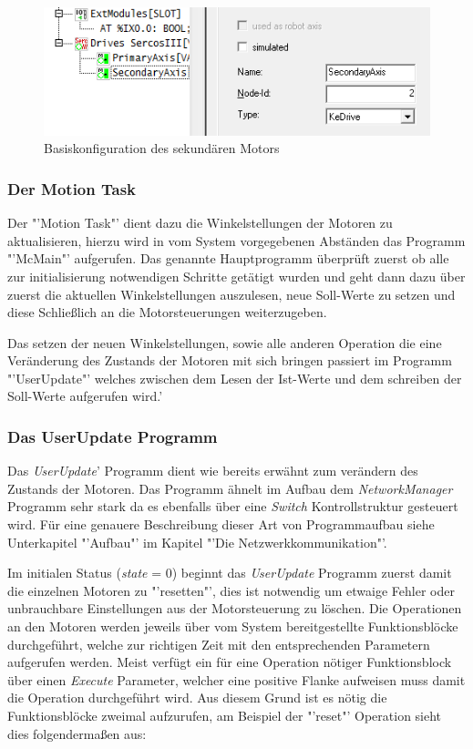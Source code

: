 \begin{figure}[H]
  \centering
  \begin{minipage}[t]{9 cm}
  	\centering
  	\includegraphics[width=9 cm]{images/DriveConfiguration} 
    \caption{Basiskonfiguration des sekundären Motors}
  \end{minipage}
\end{figure}

\subsubsection{Der Motion Task}
Der "'Motion Task"' dient dazu die Winkelstellungen der Motoren zu aktualisieren, hierzu wird in vom System vorgegebenen Abständen das Programm "'McMain"' aufgerufen. Das genannte Hauptprogramm überprüft zuerst ob alle zur initialisierung notwendigen Schritte getätigt wurden und geht dann dazu über zuerst die aktuellen Winkelstellungen auszulesen, neue Soll-Werte zu setzen und diese Schließlich an die Motorsteuerungen weiterzugeben. 

Das setzen der neuen Winkelstellungen, sowie alle anderen Operation die eine Veränderung des Zustands der Motoren mit sich bringen passiert im Programm "'UserUpdate"' welches zwischen dem Lesen der Ist-Werte und dem schreiben der Soll-Werte aufgerufen wird.'

\subsubsection{Das UserUpdate Programm}
Das \textit{UserUpdate}' Programm dient wie bereits erwähnt zum verändern des Zustands der Motoren. Das Programm ähnelt im Aufbau dem \textit{NetworkManager} Programm sehr stark da es ebenfalls über eine \textit{Switch} Kontrollstruktur gesteuert wird. Für eine genauere Beschreibung dieser Art von Programmaufbau siehe Unterkapitel "'Aufbau"' im Kapitel "'Die Netzwerkkommunikation"'.

Im initialen Status (\textit{state} = 0) beginnt das \textit{UserUpdate} Programm zuerst damit die einzelnen Motoren zu "'resetten"', dies ist notwendig um etwaige Fehler oder unbrauchbare Einstellungen aus der Motorsteuerung zu löschen. Die Operationen an den Motoren werden jeweils über vom System bereitgestellte Funktionsblöcke durchgeführt, welche zur richtigen Zeit mit den entsprechenden Parametern aufgerufen werden. Meist verfügt ein für eine Operation nötiger Funktionsblock über einen \textit{Execute} Parameter, welcher eine positive Flanke aufweisen muss damit die Operation durchgeführt wird. Aus diesem Grund ist es nötig die Funktionsblöcke zweimal aufzurufen, am Beispiel der "'reset"' Operation sieht dies folgendermaßen aus:

